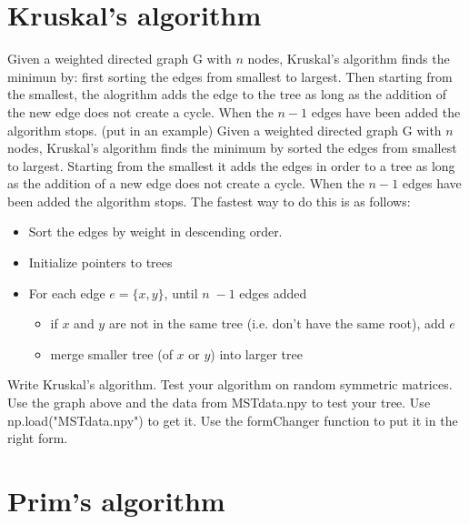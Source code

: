 \section*{Kruskal's algorithm}

Given a weighted directed graph G with $n$ nodes, Kruskal's algorithm finds the minimun by: first sorting the edges from smallest to largest. Then starting from the smallest, the alogrithm adds the edge to the tree as long as the addition of the new edge does not create a cycle. When the $n-1$ edges have been added the algorithm stops. (put in an example)
Given a weighted directed graph G with $n$ nodes, Kruskal's algorithm finds the minimum by sorted the edges from smallest to largest. Starting from the smallest it adds the edges in order to a tree as long as the addition of a new edge does not create a cycle. When the $n-1$ edges have been added the algorithm stops. The fastest way to do this is as follows:
\flushleft
\begin{itemize}
\item Sort the edges by weight in descending order.
\item Initialize pointers to trees
\item For each edge $e=\{x, y\}$, until $n-1$ edges added  
\begin{itemize}
\item if $x$ and $y$ are not in the same tree (i.e. don’t have the same root), add $e$
\item merge smaller tree (of $x$ or $y$) into larger tree 
\end{itemize}
\end{itemize}


\begin{problem}
Write Kruskal's algorithm. Test your algorithm on random symmetric matrices. Use the graph above and the data from MSTdata.npy to test your tree. Use np.load("MSTdata.npy") to get it. Use the formChanger function to put it in the right form.
\end{problem}

\section*{Prim's algorithm}

